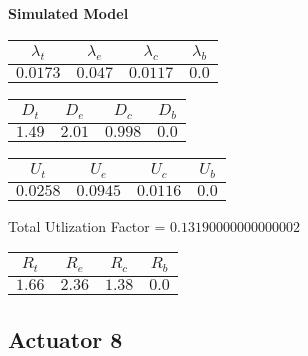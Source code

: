 \documentclass{article}
\begin{document}
\begin{minipage}{0.5\textwidth}
\centering	\textbf{Simulated Model}
\begin{table}[H]
\centering
\begin{tabular}{@{}cccc@{}}
\toprule
$\lambda_t$ & $\lambda_e$ & $\lambda_c$ & $\lambda_b$\\
\midrule
$0.0173$ & $0.047$ & $0.0117$ & $0.0$\\
\bottomrule
\end{tabular}
\end{table}
\begin{table}[H]
\centering
\begin{tabular}{@{}cccc@{}}
\toprule
$D_t$ & $D_e$ & $D_c$ & $D_b$\\
\midrule
$1.49$ & $2.01$ & $0.998$ & $0.0$\\
\bottomrule
\end{tabular}
\end{table}\begin{table}[H]
\centering
\begin{tabular}{@{}cccc@{}}
\toprule
$U_t$ & $U_e$ & $U_c$ & $U_b$\\
\midrule
$0.0258$ & $0.0945$ & $0.0116$ & $0.0$\\
\bottomrule
\end{tabular}
\end{table}
\centering Total Utlization Factor = $0.13190000000000002$
\begin{table}[H]
\centering
\begin{tabular}{@{}cccc@{}}
\toprule
$R_t$ & $R_e$ & $R_c$ & $R_b$\\
\midrule
$1.66$ & $2.36$ & $1.38$ & $0.0$\\
\bottomrule
\end{tabular}
\end{table}
\end{minipage}\subsection{Actuator 8}
\end{document}
